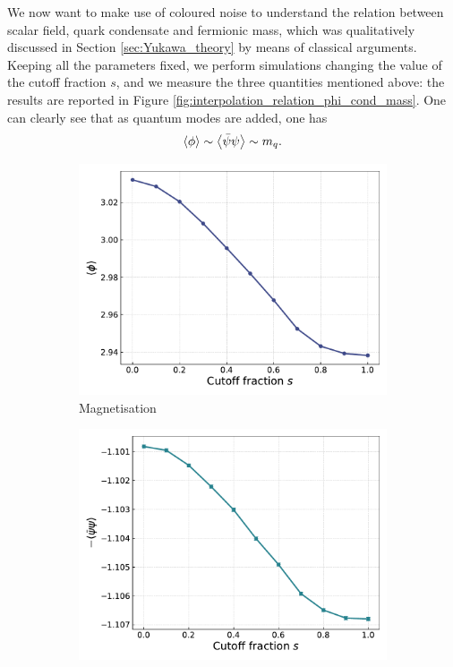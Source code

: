 We now want to make use of coloured noise to understand the relation between scalar field, quark condensate and fermionic mass, which was qualitatively discussed in Section \ref{sec:Yukawa_theory} by means of classical arguments. \\
Keeping all the parameters fixed, we perform simulations changing the value of the cutoff fraction $s$, and we measure the three quantities mentioned above: the results are reported in Figure \ref{fig:interpolation_relation_phi_cond_mass}. 
One can clearly see that as quantum modes are added, one has
\begin{equation*}
	\left\langle \phi \right\rangle \sim \left\langle \bar\psi\psi \right\rangle \sim m_q.
\end{equation*}
\begin{figure}[]
    \centering
    \begin{subfigure}[b]{0.47\textwidth}
        \includegraphics[width=1.0\textwidth]{figures/slide_broken/magnetisation.pdf}
        \caption{Magnetisation}
    \end{subfigure}
    \begin{subfigure}[b]{0.47\textwidth}
        \includegraphics[width=1.0\textwidth]{figures/slide_broken/condensate.pdf}

\end{subfigure}
\end{figure}
